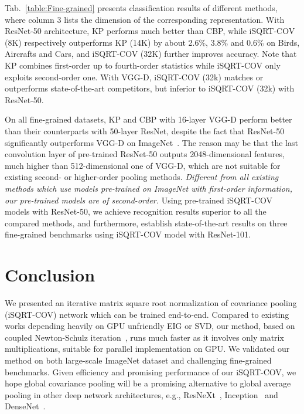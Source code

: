 \documentclass[10pt,twocolumn,letterpaper]{article}
\begin{document}
Tab.~\ref{table:Fine-grained} presents classification results of different methods, where column 3 lists the dimension of the corresponding representation. 
With ResNet-50 architecture, KP  performs much better than CBP, while  iSQRT-COV (8K) respectively outperforms KP (14K) by about 2.6\%, 3.8\% and 0.6\% on Birds, Aircrafts and Cars,  and iSQRT-COV (32K) further improves accuracy. Note that  KP combines first-order up to fourth-order statistics while iSQRT-COV only exploits second-order one.  With VGG-D, iSQRT-COV (32k)
matches or outperforms  state-of-the-art competitors, but  inferior to iSQRT-COV (32k) with ResNet-50.

On  all fine-grained datasets, KP and CBP with 16-layer VGG-D  perform  better than their counterparts with 50-layer ResNet, despite the fact that  ResNet-50 significantly  outperforms VGG-D  on ImageNet~\cite{He_2016_CVPR}.  The reason may be that the last convolution layer of pre-trained ResNet-50 outputs 2048-dimensional features, much higher than 512-dimensional one of VGG-D, which are not suitable for  existing second- or higher-order pooling methods. \textit{Different from all existing methods which use models pre-trained on ImageNet with first-order information, our pre-trained models are of second-order.} Using pre-trained iSQRT-COV models with ResNet-50, we achieve recognition results superior to all the compared methods, and furthermore, establish state-of-the-art results on three fine-grained benchmarks using iSQRT-COV model with ResNet-101.

\section{Conclusion}

We presented an iterative matrix square root normalization of covariance pooling (iSQRT-COV)  network which  can be trained end-to-end. Compared to existing works depending heavily on GPU unfriendly EIG or SVD, our method, based on coupled  Newton-Schulz iteration~\cite{Higham:2008:FM}, runs much faster as it involves only matrix multiplications, suitable for parallel implementation on GPU. We validated our method on both large-scale ImageNet dataset and challenging fine-grained benchmarks. Given efficiency and promising performance of our iSQRT-COV, we hope    global covariance pooling  will be a promising alternative to  global average pooling in other deep network architectures, e.g., ResNeXt~\cite{Xie_Ross_2017_CVPR}, Inception~\cite{DBLP:journals/corr/IoffeS15} and DenseNet~\cite{Huang_2017_CVPR}. 



{\small


}
\end{document}
